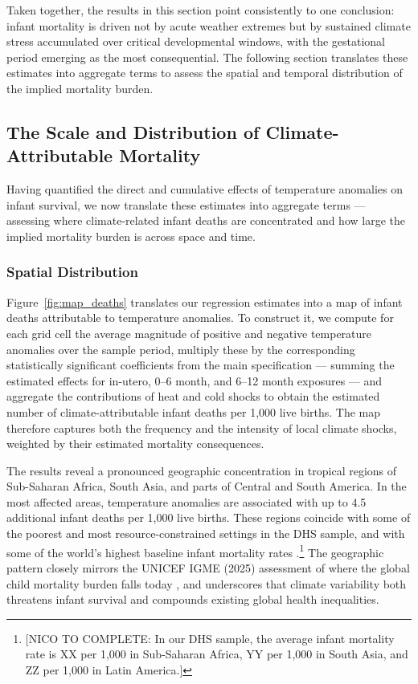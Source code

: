 \documentclass[a4paper]{article}
\begin{document}
Taken together, the results in this section point consistently to one conclusion: infant mortality is driven not by acute weather extremes but by sustained climate stress accumulated over critical developmental windows, with the gestational period emerging as the most consequential. The following section translates these estimates into aggregate terms to assess the spatial and temporal distribution of the implied mortality burden.



\subsection{The Scale and Distribution of Climate-Attributable Mortality} \label{sec:results_attributable}

Having quantified the direct and cumulative effects of temperature anomalies on infant survival, we now translate these estimates into aggregate terms — assessing where climate-related infant deaths are concentrated and how large the implied mortality burden is across space and time.

\subsubsection{Spatial Distribution}

Figure~\ref{fig:map_deaths} translates our regression estimates into a map of infant deaths attributable to temperature anomalies. To construct it, we compute for each grid cell the average magnitude of positive and negative temperature anomalies over the sample period, multiply these by the corresponding statistically significant coefficients from the main specification — summing the estimated effects for in-utero, 0--6 month, and 6--12 month exposures — and aggregate the contributions of heat and cold shocks to obtain the estimated number of climate-attributable infant deaths per 1,000 live births. The map therefore captures both the frequency and the intensity of local climate shocks, weighted by their estimated mortality consequences.

The results reveal a pronounced geographic concentration in tropical regions of Sub-Saharan Africa, South Asia, and parts of Central and South America. In the most affected areas, temperature anomalies are associated with up to 4.5 additional infant deaths per 1,000 live births. These regions coincide with some of the poorest and most resource-constrained settings in the DHS sample, and with some of the world's highest baseline infant mortality rates \parencite{WHO2022,UNICEF2023}.\footnote{[NICO TO COMPLETE: In our DHS sample, the average infant mortality rate is XX per 1,000 in Sub-Saharan Africa, YY per 1,000 in South Asia, and ZZ per 1,000 in Latin America.]} The geographic pattern closely mirrors the UNICEF IGME (2025) assessment of where the global child mortality burden falls today \parencite{UNIGME2025}, and underscores that climate variability both threatens infant survival and compounds existing global health inequalities.
\end{document}
